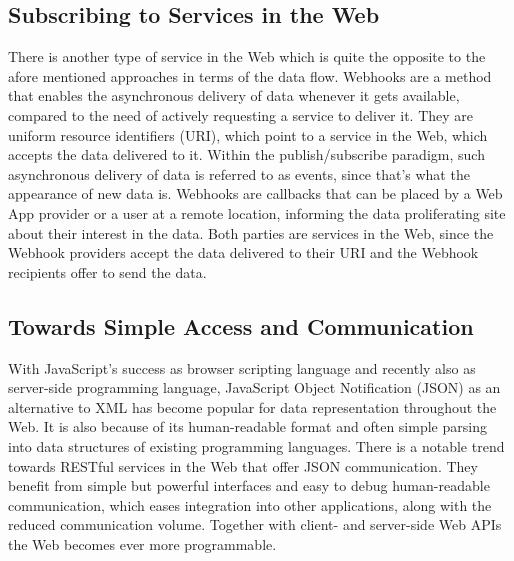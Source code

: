 \subsection{Subscribing to Services in the Web}
There is another type of service in the Web which is quite the opposite to the afore mentioned approaches in terms of the data flow.
\textrm{Webhooks} are a method that enables the asynchronous delivery of data whenever it gets available, compared to the need of actively requesting a service to deliver it.
They are uniform resource identifiers (\textrm{URI}), which point to a service in the Web, which accepts the data delivered to it.
Within the publish/subscribe paradigm, such asynchronous delivery of data is referred to as events, since that's what the appearance of new data is.
\textrm{Webhooks} are callbacks that can be placed by a \textrm{Web App} provider or a user at a remote location, informing the data proliferating site about their interest in the data.
Both parties are services in the Web, since the \textrm{Webhook} providers accept the data delivered to their \textrm{URI} and the \textrm{Webhook} recipients offer to send the data.


\subsection{Towards Simple Access and Communication}
With JavaScript's success as browser scripting language and recently also as server-side programming language, JavaScript Object Notification (\textrm{JSON}) as an alternative to \textrm{XML} has become popular for data representation throughout the Web.
It is also because of its human-readable format and often simple parsing into data structures of existing programming languages.
There is a notable trend towards \textrm{RESTful} services in the Web that offer \textrm{JSON} communication.
They benefit from simple but powerful interfaces and easy to debug human-readable communication, which eases integration into other applications, along with the reduced communication volume.
Together with client- and server-side \textrm{Web APIs} the Web becomes ever more programmable.



